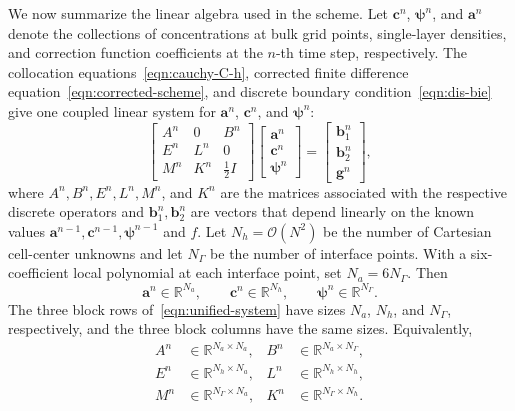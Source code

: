 \documentclass[11pt,reqno]{amsart}
\theoremstyle{plain}
\theoremstyle{definition}
\numberwithin{equation}{section}
\newcommand{\mc}[1]{\mathcal{#1}}
\newcommand{\bm}[1]{\boldsymbol{#1}}
\newcommand{\R}{\mathbb{R}}
\begin{document}
We now summarize the linear algebra used in the scheme.
Let $\bm c^n$, $\bm \psi^n$, and $\bm a^n$ denote the collections of concentrations at bulk grid points, single-layer densities, and correction function coefficients at the $n$-th time step, respectively.
The collocation equations~\eqref{eqn:cauchy-C-h}, corrected finite difference equation~\eqref{eqn:corrected-scheme}, and discrete boundary condition~\eqref{eqn:dis-bie} give one coupled linear system for $\bm a^n$, $\bm c^n$, and $\bm \psi^n$:
\begin{equation}\label{eqn:unified-system}
\begin{bmatrix}
A^n & 0 & B^n \\
E^n & L^n & 0 \\
M^n & K^n & \frac{1}{2}I
\end{bmatrix}
\begin{bmatrix}
\bm a^n \\
\bm c^n \\
\bm \psi^n
\end{bmatrix}
=
\begin{bmatrix}
\bm b_1^n \\
\bm b_2^n \\
\bm g^n
\end{bmatrix},
\end{equation}
where $A^n, B^n, E^n, L^n, M^n$, and $K^n$ are the matrices associated with the respective discrete operators and $\bm b_1^n,\bm b_2^n$ are vectors that depend linearly on the known values $\bm a^{n-1}, \bm c^{n-1}, \bm \psi^{n-1}$ and $f$.
Let $N_h=\mc{O}(N^2)$ be the number of Cartesian cell-center unknowns and let
$N_\Gamma$ be the number of interface points. With a
six-coefficient local polynomial at each interface point, set
$N_a=6N_\Gamma$. Then
\begin{equation}
\bm a^n\in\R^{N_a},\qquad
\bm c^n\in\R^{N_h},\qquad
\bm\psi^n\in\R^{N_\Gamma}.
\end{equation}
The three block rows of~\eqref{eqn:unified-system} have sizes
$N_a$, $N_h$, and $N_\Gamma$, respectively, and the three block columns
have the same sizes. Equivalently,
\begin{equation}
\begin{aligned}
A^n&\in\R^{N_a\times N_a},&
B^n&\in\R^{N_a\times N_\Gamma},\\
E^n&\in\R^{N_h\times N_a},&
L^n&\in\R^{N_h\times N_h},\\
M^n&\in\R^{N_\Gamma\times N_a},&
K^n&\in\R^{N_\Gamma\times N_h}.
\end{aligned}
\end{equation}
\end{document}
